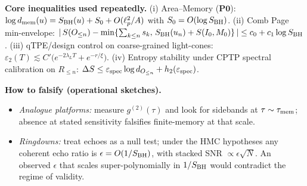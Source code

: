 \documentclass[11pt,a4paper]{article}
\theoremstyle{plain}
\theoremstyle{definition}
\theoremstyle{remark}
\begin{document}
\smallskip
\noindent\textbf{Core inequalities used repeatedly.}
(i) Area--Memory (\(\mathbf{P0}\)): \(\log d_{\rm mem}(u)=S_{\rm BH}(u)+S_0+O(\ell_p^2/A)\) with \(S_0=O(\log S_{\rm BH})\).
(ii) Comb Page min-envelope: \(|\,S(O_{\le n})-\min\{\sum_{k\le n}s_k,\,S_{\rm BH}(u_n)+S(I_0,M_0)\}\,|\le c_0+c_1\log S_{\rm BH}\).
(iii) qTPE/design control on coarse-grained light-cones: \(\varepsilon_2(T)\lesssim C'\big(e^{-2\lambda_L T}+e^{-r/\xi}\big)\).
(iv) Entropy stability under CPTP spectral calibration on \(R_{\le n}\): \(\Delta S \le \varepsilon_{\rm spec}\log d_{O_{\le n}}+h_2(\varepsilon_{\rm spec})\).

\smallskip
\noindent\textbf{How to falsify (operational sketches).}
\begin{itemize}
\item \emph{Analogue platforms:} measure \(g^{(2)}(\tau)\) and look for sidebands at \(\tau\sim\tau_{\rm mem}\); absence at stated sensitivity falsifies finite-memory at that scale.
\item \emph{Ringdowns:} treat echoes as a null test; under the HMC hypotheses any coherent echo ratio is \(\epsilon=O(1/S_{\rm BH})\), with stacked SNR \(\propto \epsilon\sqrt{N}\). An observed \(\epsilon\) that scales super-polynomially in \(1/S_{\rm BH}\) would contradict the regime of validity.
\end{itemize}
\end{document}
